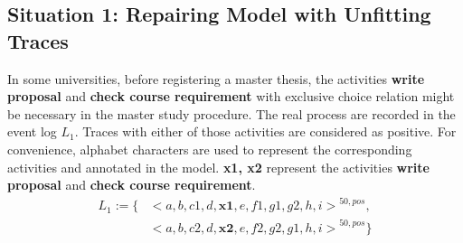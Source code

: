 \subsection{Situation 1: \small{Repairing Model with Unfitting Traces}} %
In some universities, before registering a master thesis, the activities \textbf{write proposal} and \textbf{check course requirement} with exclusive choice relation might be necessary in the master study procedure. The real process are recorded in the event log $L_1$. Traces with either of those activities are considered as positive. For convenience, alphabet characters are used to represent the corresponding activities and annotated in the model. \textbf{x1, x2} represent the activities \textbf{write proposal} and \textbf{check course requirement}.
		\begin{align*}
		L_1:= \{ &  {<a,b,c1,d,\textbf{x1},e,f1,g1,g2,h,i>}^{50, pos}, \\   
		             &{<a,b,c2,d,\textbf{x2}, e, f2,g2,g1,h,i>}^{50,pos} \}
		\end{align*}
